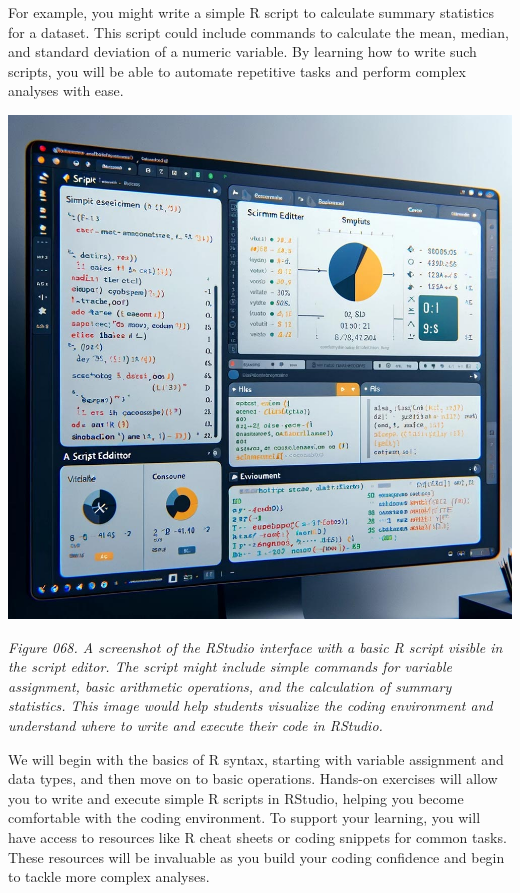 \documentclass[
]{book}
\begin{document}
For example, you might write a simple R script to calculate summary statistics for a dataset. This script could include commands to calculate the mean, median, and standard deviation of a numeric variable. By learning how to write such scripts, you will be able to automate repetitive tasks and perform complex analyses with ease.

\includegraphics[width=1\textwidth,height=\textheight]{images/fig068.jpg}

\emph{Figure 068. A screenshot of the RStudio interface with a basic R script visible in the script editor. The script might include simple commands for variable assignment, basic arithmetic operations, and the calculation of summary statistics. This image would help students visualize the coding environment and understand where to write and execute their code in RStudio.}

We will begin with the basics of R syntax, starting with variable assignment and data types, and then move on to basic operations. Hands-on exercises will allow you to write and execute simple R scripts in RStudio, helping you become comfortable with the coding environment. To support your learning, you will have access to resources like R cheat sheets or coding snippets for common tasks. These resources will be invaluable as you build your coding confidence and begin to tackle more complex analyses.
\end{document}
